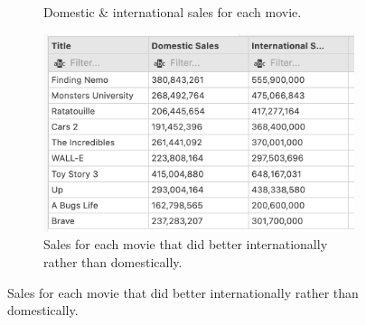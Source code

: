 \begin{figure}[H]
\begin{subfigure}{.5\textwidth}
        \caption*{Domestic \& international sales for each movie.}
        \label{fig:q5}
    \end{subfigure}
    \begin{subfigure}{.5\textwidth}
        \centering
        \includegraphics[width=.8\linewidth]{images/output/q6.png}
        \caption*{Sales for each movie that did better internationally rather than domestically.}
        \label{fig:q6}
    \end{subfigure}
\end{figure}
\pagebreak

